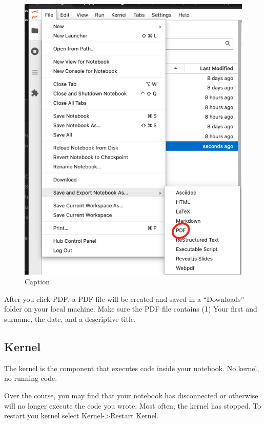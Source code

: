 \begin{figure}
    \centering
    \includegraphics{chapters/chapter1/savepdf.png}
    \caption{Caption}
    \label{fig:my_label}
\end{figure}


After you
click PDF, a PDF file will be created and saved in a ``Downloads''
folder on your local machine. Make sure the PDF file contains (1) Your
first and surname, the date, and a descriptive title.

\hypertarget{kernel}{%
\subsection{Kernel}\label{kernel}}

The kernel is the component that executes code inside your notebook. No
kernel, no running code.

Over the course, you may find that your notebook has disconnected or
otherwise will no longer execute the code you wrote. Most often, the
kernel has stopped. To restart you kernel select
Kernel-\textgreater Restart Kernel.

